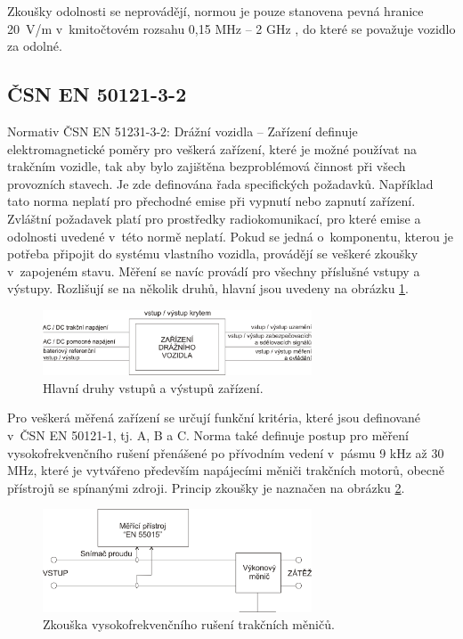 Zkoušky odolnosti se neprovádějí, normou je pouze stanovena pevná hranice 20~V/m v~kmitočtovém rozsahu 0,15 MHz – 2 GHz , do které se považuje vozidlo za odolné.

\subsection{ČSN EN 50121-3-2}
Normativ ČSN EN 51231-3-2: Drážní vozidla – Zařízení definuje elektromagnetické poměry pro veškerá zařízení, které je možné používat na trakčním vozidle, tak aby bylo zajištěna bezproblémová činnost při všech provozních stavech. Je zde definována řada specifických požadavků. Například tato norma neplatí pro přechodné emise při vypnutí nebo zapnutí zařízení. Zvláštní požadavek platí pro prostředky radiokomunikací, pro které emise a odolnosti uvedené v~této normě neplatí. Pokud se jedná o~komponentu, kterou je potřeba připojit do systému vlastního vozidla, provádějí se veškeré zkoušky v~zapojeném stavu. Měření se navíc provádí pro všechny příslušné vstupy a výstupy. 
Rozlišují se na několik druhů, hlavní jsou uvedeny na obrázku \ref{obr:emc_IO}.

\begin{figure}[!h]
	\centering
	\includegraphics[width=8cm]{emc_IO.png}
	\caption{Hlavní druhy vstupů a výstupů zařízení. \cite{csn}}
	\label{obr:emc_IO}
\end{figure}

Pro veškerá měřená zařízení se určují funkční kritéria, které jsou definované v~ČSN EN 50121-1, tj. A, B a C. Norma také definuje postup pro měření vysokofrekvenčního rušení přenášené po přívodním vedení v~pásmu 9 kHz až 30 MHz, které je vytvářeno především napájecími měniči trakčních motorů, obecně přístrojů se spínanými zdroji. Princip zkoušky je naznačen na obrázku \ref{obr:emc_vf}. 

\begin{figure}[!h]
	\centering
	\includegraphics[width=8cm]{emc_vf.png}
	\caption{Zkouška vysokofrekvenčního rušení trakčních měničů.\cite{csn}}
	\label{obr:emc_vf}
\end{figure}

